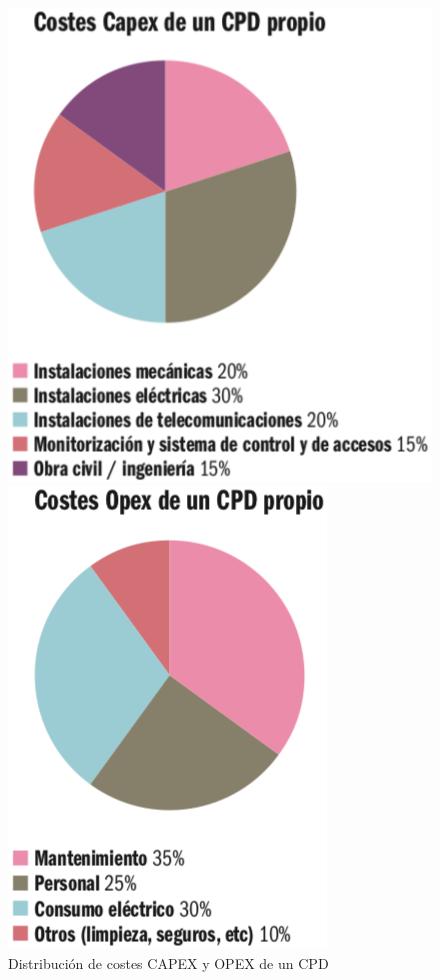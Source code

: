 \begin{figure}
    \centering
    \begin{minipage}{.5\textwidth}
        \centering
        \includegraphics[width=0.75\linewidth]{figures/images/capex.png}
    \end{minipage}%
    \begin{minipage}{.5\textwidth}
        \centering
        \includegraphics[width=0.55\linewidth]{figures/images/opex.png}
    \end{minipage}
    \caption{Distribución de costes \acs{CAPEX} y \acs{OPEX} de un \acs{CPD}}
    \label{fig:costes_cpd}
\end{figure}

